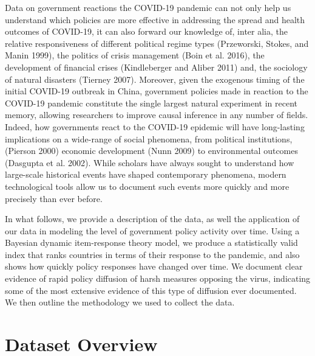 \documentclass[]{article}
\begin{document}
Data on government reactions the COVID-19 pandemic can not only help us understand which policies are more effective in addressing the spread and health outcomes of COVID-19, it can also forward our knowledge of, inter alia, the relative responsiveness of different political regime types (Przeworski, Stokes, and Manin 1999), the politics of crisis management (Boin et al. 2016), the development of financial crises (Kindleberger and Aliber 2011) and, the sociology of natural disasters (Tierney 2007). Moreover, given the exogenous timing of the initial COVID-19 outbreak in China, government policies made in reaction to the COVID-19 pandemic constitute the single largest natural experiment in recent memory, allowing researchers to improve causal inference in any number of fields. Indeed, how governments react to the COVID-19 epidemic will have long-lasting implications on a wide-range of social phenomena, from political institutions, (Pierson 2000) economic development (Nunn 2009) to environmental outcomes (Dasgupta et al. 2002). While scholars have always sought to understand how large-scale historical events have shaped contemporary phenomena, modern technological tools allow us to document such events more quickly and more precisely than ever before.

In what follows, we provide a description of the data, as well the application of our data in modeling the level of government policy activity over time. Using a Bayesian dynamic item-response theory model, we produce a statistically valid index that ranks countries in terms of their response to the pandemic, and also shows how quickly policy responses have changed over time. We document clear evidence of rapid policy diffusion of harsh measures opposing the virus, indicating some of the most extensive evidence of this type of diffusion ever documented. We then outline the methodology we used to collect the data.

\hypertarget{dataset-overview}{%
\section{Dataset Overview}\label{dataset-overview}}
\end{document}
